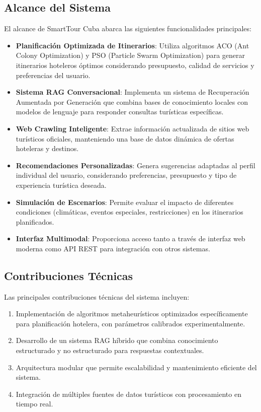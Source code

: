 \documentclass[runningheads]{llncs}
\begin{document}
\subsection{Alcance del Sistema}

El alcance de SmartTour Cuba abarca las siguientes funcionalidades principales:

\begin{itemize}
\item \textbf{Planificación Optimizada de Itinerarios}: Utiliza algoritmos ACO (Ant Colony Optimization) y PSO (Particle Swarm Optimization) para generar itinerarios hoteleros óptimos considerando presupuesto, calidad de servicios y preferencias del usuario.

\item \textbf{Sistema RAG Conversacional}: Implementa un sistema de Recuperación Aumentada por Generación que combina bases de conocimiento locales con modelos de lenguaje para responder consultas turísticas específicas.

\item \textbf{Web Crawling Inteligente}: Extrae información actualizada de sitios web turísticos oficiales, manteniendo una base de datos dinámica de ofertas hoteleras y destinos.

\item \textbf{Recomendaciones Personalizadas}: Genera sugerencias adaptadas al perfil individual del usuario, considerando preferencias, presupuesto y tipo de experiencia turística deseada.

\item \textbf{Simulación de Escenarios}: Permite evaluar el impacto de diferentes condiciones (climáticas, eventos especiales, restricciones) en los itinerarios planificados.

\item \textbf{Interfaz Multimodal}: Proporciona acceso tanto a través de interfaz web moderna como API REST para integración con otros sistemas.
\end{itemize}

\subsection{Contribuciones Técnicas}

Las principales contribuciones técnicas del sistema incluyen:

\begin{enumerate}
\item Implementación de algoritmos metaheurísticos optimizados específicamente para planificación hotelera, con parámetros calibrados experimentalmente.

\item Desarrollo de un sistema RAG híbrido que combina conocimiento estructurado y no estructurado para respuestas contextuales.

\item Arquitectura modular que permite escalabilidad y mantenimiento eficiente del sistema.

\item Integración de múltiples fuentes de datos turísticos con procesamiento en tiempo real.
\end{enumerate}
\end{document}
